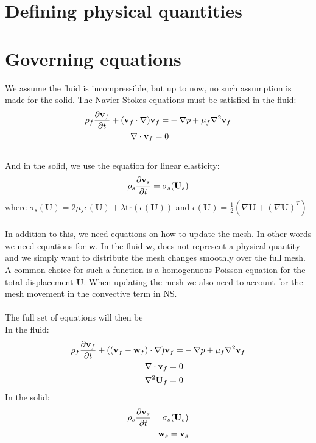 \documentclass{article}
\begin{document}
\section{Defining physical quantities}

\section{Governing equations}
We assume the fluid is incompressible, but up to now, no such assumption is made for the solid. The Navier Stokes equations must be satisfied in the fluid:
\begin{align}
\rho_f\frac{\partial \mathbf{v}_f}{\partial t} + (\mathbf{v}_f\cdot\nabla) \mathbf{v}_f = & -\nabla p + \mu_f\nabla^2 \mathbf{v}_f \\
\nabla \cdot \mathbf{v}_f = 0
\end{align}
\\
And in the solid, we use the equation for linear elasticity:
\begin{align}
\rho_s\frac{\partial \mathbf{v}_s}{\partial t} = \sigma_s(\mathbf{U}_s)
\end{align}
where $\sigma_s(\mathbf{U}) = 2\mu_s\epsilon(\mathbf{U}) + \lambda\text{tr}(\epsilon(\mathbf{U}))$ and $\epsilon(\mathbf{U}) = \frac{1}{2}(\nabla \mathbf{U} + (\nabla \mathbf{U})^T)$
\\
\\
In addition to this, we need equations on how to update the mesh. In other words we need equations for $\mathbf{w}$. In the fluid $\mathbf{w}$, does not represent a physical quantity and we simply want to distribute the mesh changes smoothly over the full mesh. A common choice for such a function is a homogenuous Poisson equation for the total displacement $\mathbf{U}$. When updating the mesh we also need to account for the mesh movement in the convective term in NS. \\
\\ The full set of equations will then be \\
In the fluid:
\begin{align}
\rho_f\frac{\partial \mathbf{v}_f}{\partial t} + ((\mathbf{v}_f-\mathbf{w}_f)\cdot\nabla) \mathbf{v}_f = & -\nabla p + \mu_f\nabla^2 \mathbf{v}_f \\
\nabla \cdot \mathbf{v}_f = 0 \\
\nabla^2 \mathbf{U}_f = 0   \label{NS}
\end{align}
In the solid:
\begin{align}
\rho_s\frac{\partial \mathbf{v}_s}{\partial t} = \sigma_s(\mathbf{U}_s) \\
\mathbf{w}_s = \mathbf{v}_s \label{LE}
\end{align}
\\
\end{document}
